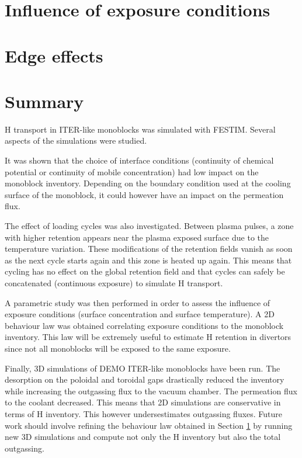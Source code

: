 \section{Influence of exposure conditions} \label{influence of exposure conditions}


\section{Edge effects} \label{3D edge effects}


\section{Summary}
H transport in ITER-like monoblocks was simulated with FESTIM.
Several aspects of the simulations were studied.

It was shown that the choice of interface conditions (continuity of chemical potential or continuity of mobile concentration) had low impact on the monoblock inventory.
Depending on the boundary condition used at the cooling surface of the monoblock, it could however have an impact on the permeation flux.

The effect of loading cycles was also investigated.
Between plasma pulses, a zone with higher retention appears near the plasma exposed surface due to the temperature variation.
These modifications of the retention fields vanish as soon as the next cycle starts again and this zone is heated up again.
This means that cycling has no effect on the global retention field and that cycles can safely be concatenated (continuous exposure) to simulate H transport.

A parametric study was then performed in order to assess the influence of exposure conditions (surface concentration and surface temperature).
A 2D behaviour law was obtained correlating exposure conditions to the monoblock inventory.
This law will be extremely useful to estimate H retention in divertors since not all monoblocks will be exposed to the same exposure.

Finally, 3D simulations of DEMO ITER-like monoblocks have been run.
The desorption on the poloidal and toroidal gaps drastically reduced the inventory while increasing the outgassing flux to the vacuum chamber.
The permeation flux to the coolant decreased.
This means that 2D simulations are conservative in terms of H inventory.
This however undersestimates outgassing fluxes.
Future work should involve refining the behaviour law obtained in Section \ref{influence of exposure conditions} by running new 3D simulations and compute not only the H inventory but also the total outgassing.
